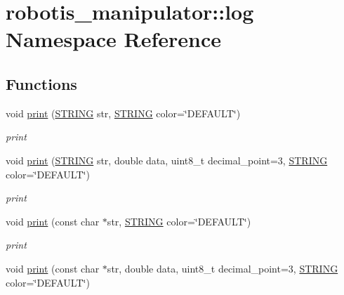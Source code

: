 \hypertarget{namespacerobotis__manipulator_1_1log}{}\section{robotis\+\_\+manipulator\+:\+:log Namespace Reference}
\label{namespacerobotis__manipulator_1_1log}
\subsection*{Functions}
\begin{DoxyCompactItemize}
\item 
void \hyperlink{namespacerobotis__manipulator_1_1log_ae01dad0f024eca3ad53f068204f6f293}{print} (\hyperlink{robotis__manipulator__log_8h_a67f156408fa9d656017c406fe4f4b330}{S\+T\+R\+I\+NG} str, \hyperlink{robotis__manipulator__log_8h_a67f156408fa9d656017c406fe4f4b330}{S\+T\+R\+I\+NG} color=\char`\"{}D\+E\+F\+A\+U\+LT\char`\"{})
\begin{DoxyCompactList}\small\item\em print \end{DoxyCompactList}\item 
void \hyperlink{namespacerobotis__manipulator_1_1log_ae2a75986a4f1075ab21646ff1fa5a21a}{print} (\hyperlink{robotis__manipulator__log_8h_a67f156408fa9d656017c406fe4f4b330}{S\+T\+R\+I\+NG} str, double data, uint8\+\_\+t decimal\+\_\+point=3, \hyperlink{robotis__manipulator__log_8h_a67f156408fa9d656017c406fe4f4b330}{S\+T\+R\+I\+NG} color=\char`\"{}D\+E\+F\+A\+U\+LT\char`\"{})
\begin{DoxyCompactList}\small\item\em print \end{DoxyCompactList}\item 
void \hyperlink{namespacerobotis__manipulator_1_1log_a8542b07bf2d0593a159d4e69cb19eceb}{print} (const char $\ast$str, \hyperlink{robotis__manipulator__log_8h_a67f156408fa9d656017c406fe4f4b330}{S\+T\+R\+I\+NG} color=\char`\"{}D\+E\+F\+A\+U\+LT\char`\"{})
\begin{DoxyCompactList}\small\item\em print \end{DoxyCompactList}\item 
void \hyperlink{namespacerobotis__manipulator_1_1log_a66839de0f964739cad9aa81383a9d651}{print} (const char $\ast$str, double data, uint8\+\_\+t decimal\+\_\+point=3, \hyperlink{robotis__manipulator__log_8h_a67f156408fa9d656017c406fe4f4b330}{S\+T\+R\+I\+NG} color=\char`\"{}D\+E\+F\+A\+U\+LT\char`\"{})

\end{DoxyCompactItemize}
